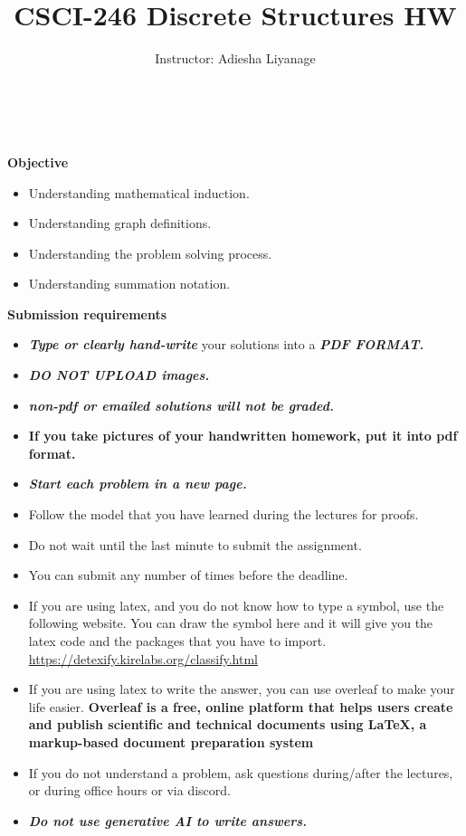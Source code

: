 \documentclass[12pt]{exam}
\title{CSCI-246 Discrete Structures HW \assignmentnumber}
\author{Instructor: Adiesha Liyanage}
\begin{document}
\maketitle

\hrulefill
\\
\\
\textbf{Objective}
\begin{itemize}
    \item Understanding mathematical induction.
    \item Understanding graph definitions.
    \item Understanding the problem solving process.
    \item Understanding summation notation.
\end{itemize}

\textbf{Submission requirements}
\begin{itemize}
    \item \textbf{\textit{Type or clearly hand-write}} your solutions into a \textbf{\textit{PDF FORMAT.}} 
    \item \textbf{\textit{DO NOT UPLOAD images.}}
    \item \textbf{\textit{non-pdf or emailed solutions will not be graded.}}
    \item \textbf{If you take pictures of your handwritten homework, put it into pdf format.}
    \item \textbf{\textit{Start each problem in a new page.}}
    \item Follow the model that you have learned during the lectures for proofs.
    \item Do not wait until the last minute to submit the assignment.
    \item You can submit any number of times before the deadline. 
    \item If you are using latex, and you do not know how to type a symbol, use the following website. You can draw the symbol here and it will give you the latex code and the packages that you have to import. \url{https://detexify.kirelabs.org/classify.html}
    \item If you are using latex to write the answer, you can use overleaf to make your life easier. \textbf{Overleaf is a free, online platform that helps users create and publish scientific and technical documents using LaTeX, a markup-based document preparation system}
    \item If you do not understand a problem, ask questions during/after the lectures, or during office hours or via discord.
    \item \textbf{\textit{Do not use generative AI to write answers.}} 
\end{itemize}
\end{document}
